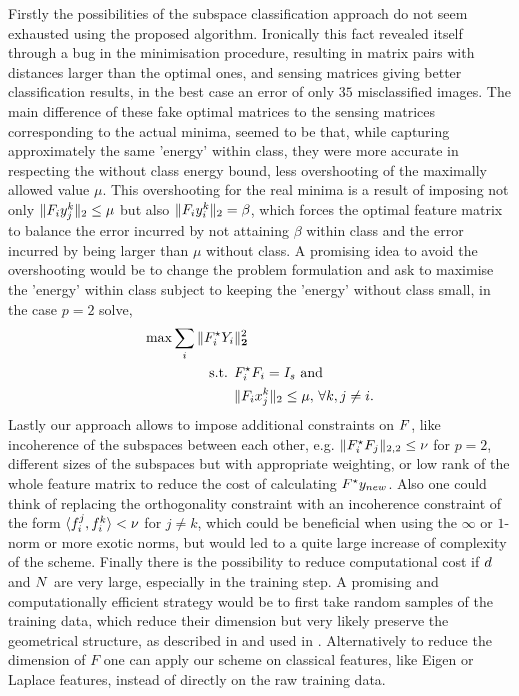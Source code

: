 \documentclass[11pt]{article}
\begin{document}
Firstly the possibilities of the subspace classification approach do not seem exhausted using the proposed algorithm. Ironically this fact revealed itself through a bug in the minimisation procedure, resulting in matrix pairs with distances larger than the optimal ones, and sensing matrices giving better classification results, \ie in the best case an error of only $35$ misclassified images. The main difference of these fake optimal matrices to the sensing matrices corresponding to the actual minima, seemed to be that, while capturing approximately the same 'energy' within class, they were more accurate in respecting the without class energy bound, \ie less overshooting of the maximally allowed value $\mu$. This overshooting for the real minima is a result of imposing not only $\|{F}_i {y}_j^k\|_2\leq\mu$ but also $\|{F}_i {y}_i^k\|_2=\beta$, which forces the optimal feature matrix to balance the error incurred by not attaining $\beta$ within class and the error incurred by being larger than $\mu$ without class.
A promising idea to avoid the overshooting would be to change the problem formulation and ask to
maximise the 'energy' within class subject to keeping the 'energy' without class small, \ie in the case $p=2$ solve,
\begin{align}
\max \sum_i \|{F}_i^\star {Y}_i&\|^2_\mathbf{2} \notag \\
 \mbox{ s.t. }  & {F}_i^\star {F}_i = I_{s}  \mbox{ and } \notag \\
&\|{F}_i x_j^k\|_2 \leq \mu, \,\forall k, j\neq i.\notag
\end{align}
Lastly our approach allows to impose additional constraints on ${F}$, like incoherence of the subspaces between each other, e.g. $ \|{F}_i^\star {F}_j\|_{2,2}\leq \nu$ for $p=2$, different sizes of the subspaces but with appropriate weighting, or low rank of the whole feature matrix to reduce the cost of calculating ${F}^\star {y}_{new}$. Also one could think of replacing the orthogonality constraint with an incoherence constraint of the form $\langle {f}_i^j, {f}_i^k\rangle<\nu$ for $j\neq k$, which could be beneficial when using the $\infty$ or $1$-norm or more exotic norms, but would led to a quite large increase of complexity of the scheme.
Finally there is the possibility to reduce computational cost if ${d}$ and ${N}$ are very large, especially in the training step. A promising and computationally efficient strategy would be to first take random samples of the training data, which reduce their dimension but very likely preserve the geometrical structure, as described in \cite{ac01} and used in \cite{wrma09}. Alternatively to reduce the dimension of $F$ one can apply our scheme on classical features, like Eigen or Laplace features, instead of directly on the raw training data.
\end{document}

